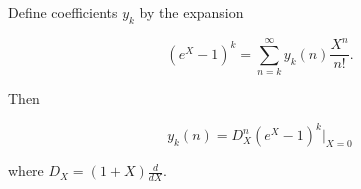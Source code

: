 Define coefficients $y_k$ by the expansion

$$(e^X - 1)^k = \sum_{n=k}^{\infty} y_k(n) \frac{X^n}{n!}.$$

Then

$$y_k(n) = D_X^n (e^X - 1)^k \big|_{X=0}$$

where $D_X = (1+X)\frac{d}{dX}$.

